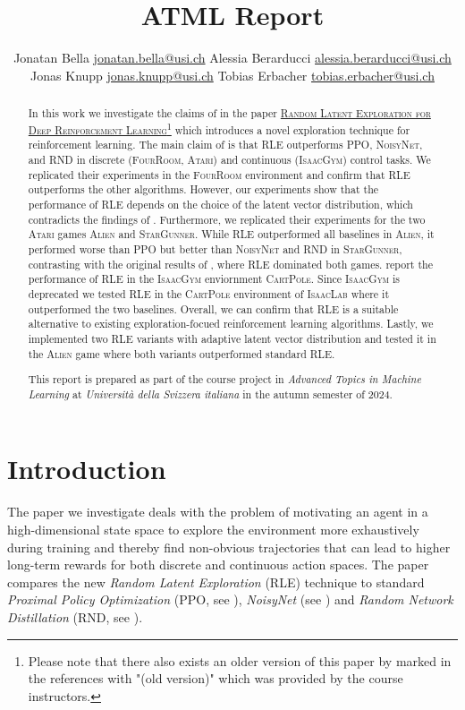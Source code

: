 \documentclass[10pt]{article} %
\title{ATML Report}
\author{%
  \name Jonatan Bella \email \href{mailto:jonatan.bella@usi.ch}{jonatan.bella@usi.ch}
  \AND
  \name Alessia Berarducci \email \href{mailto:alessia.berarducci@usi.ch}{alessia.berarducci@usi.ch}
  \AND
  \name Jonas Knupp \email \href{mailto:jonas.knupp@usi.ch}{jonas.knupp@usi.ch}
  \AND
  \name Tobias Erbacher \email \href{mailto:tobias.erbacher@usi.ch}{tobias.erbacher@usi.ch}
}
\begin{document}
\maketitle

\begin{abstract}
In this work we investigate the claims of \cite{rle-paper} in the paper \href{https://arxiv.org/abs/2407.13755}{\textsc{Random Latent Exploration for Deep Reinforcement Learning}}\footnote{Please note that there also exists an older version of this paper by \cite{rle-paper-old} marked in the references with "(old version)" which was provided by the course instructors.} which introduces a novel exploration technique for reinforcement learning. The main claim of \cite{rle-paper} is that RLE outperforms \textsc{PPO}, \textsc{NoisyNet}, and \textsc{RND} in discrete (\textsc{FourRoom}, \textsc{Atari}) and continuous (\textsc{IsaacGym}) control tasks. We replicated their experiments in the \textsc{FourRoom} environment and confirm that \textsc{RLE} outperforms the other algorithms. However, our experiments show that the performance of \textsc{RLE} depends on the choice of the latent vector distribution, which contradicts the findings of \cite{rle-paper}. Furthermore, we replicated their experiments for the two \textsc{Atari} games \textsc{Alien} and \textsc{StarGunner}. While RLE outperformed all baselines in \textsc{Alien}, it performed worse than \textsc{PPO} but better than \textsc{NoisyNet} and \textsc{RND} in \textsc{StarGunner}, contrasting with the original results of \cite{rle-paper}, where RLE dominated both games. \cite{rle-paper} report the performance of \textsc{RLE} in the \textsc{IsaacGym} enviornment \textsc{CartPole}. Since \textsc{IsaacGym} is deprecated we tested RLE in the \textsc{CartPole} environment of \textsc{IsaacLab} where it outperformed the two baselines. Overall, we can confirm that \textsc{RLE} is a suitable alternative to existing exploration-focued reinforcement learning algorithms. Lastly, we implemented two \textsc{RLE} variants with adaptive latent vector distribution and tested it in the \textsc{Alien} game where both variants outperformed standard \textsc{RLE}.


This report is prepared as part of the course project in \textit{Advanced Topics in Machine Learning} at \textit{Università della Svizzera italiana} in the autumn semester of 2024. 
\end{abstract}

\vspace{-18pt}
\section{Introduction}
The paper we investigate deals with the problem of motivating an agent in a high-dimensional state space to explore the environment more exhaustively during training and thereby find non-obvious trajectories that can lead to higher long-term rewards for both discrete and continuous action spaces. The paper compares the new \textit{Random Latent Exploration} (RLE) technique to standard \textit{Proximal Policy Optimization} (PPO, see \cite{ppo-paper}), \textit{NoisyNet} (see \cite{noisynet-paper}) and \textit{Random Network Distillation} (RND, see \cite{rnd-paper}).
\end{document}
